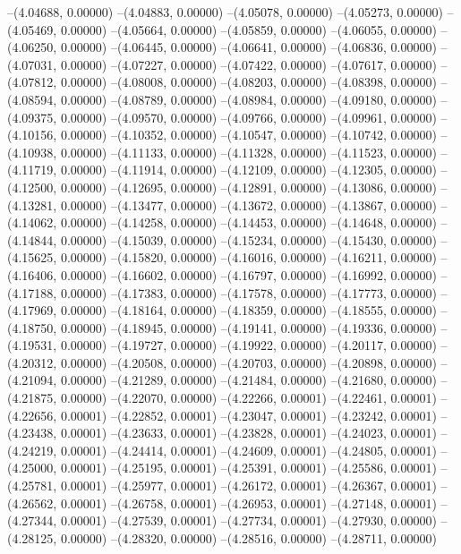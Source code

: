 --(4.04688, 0.00000)
--(4.04883, 0.00000)
--(4.05078, 0.00000)
--(4.05273, 0.00000)
--(4.05469, 0.00000)
--(4.05664, 0.00000)
--(4.05859, 0.00000)
--(4.06055, 0.00000)
--(4.06250, 0.00000)
--(4.06445, 0.00000)
--(4.06641, 0.00000)
--(4.06836, 0.00000)
--(4.07031, 0.00000)
--(4.07227, 0.00000)
--(4.07422, 0.00000)
--(4.07617, 0.00000)
--(4.07812, 0.00000)
--(4.08008, 0.00000)
--(4.08203, 0.00000)
--(4.08398, 0.00000)
--(4.08594, 0.00000)
--(4.08789, 0.00000)
--(4.08984, 0.00000)
--(4.09180, 0.00000)
--(4.09375, 0.00000)
--(4.09570, 0.00000)
--(4.09766, 0.00000)
--(4.09961, 0.00000)
--(4.10156, 0.00000)
--(4.10352, 0.00000)
--(4.10547, 0.00000)
--(4.10742, 0.00000)
--(4.10938, 0.00000)
--(4.11133, 0.00000)
--(4.11328, 0.00000)
--(4.11523, 0.00000)
--(4.11719, 0.00000)
--(4.11914, 0.00000)
--(4.12109, 0.00000)
--(4.12305, 0.00000)
--(4.12500, 0.00000)
--(4.12695, 0.00000)
--(4.12891, 0.00000)
--(4.13086, 0.00000)
--(4.13281, 0.00000)
--(4.13477, 0.00000)
--(4.13672, 0.00000)
--(4.13867, 0.00000)
--(4.14062, 0.00000)
--(4.14258, 0.00000)
--(4.14453, 0.00000)
--(4.14648, 0.00000)
--(4.14844, 0.00000)
--(4.15039, 0.00000)
--(4.15234, 0.00000)
--(4.15430, 0.00000)
--(4.15625, 0.00000)
--(4.15820, 0.00000)
--(4.16016, 0.00000)
--(4.16211, 0.00000)
--(4.16406, 0.00000)
--(4.16602, 0.00000)
--(4.16797, 0.00000)
--(4.16992, 0.00000)
--(4.17188, 0.00000)
--(4.17383, 0.00000)
--(4.17578, 0.00000)
--(4.17773, 0.00000)
--(4.17969, 0.00000)
--(4.18164, 0.00000)
--(4.18359, 0.00000)
--(4.18555, 0.00000)
--(4.18750, 0.00000)
--(4.18945, 0.00000)
--(4.19141, 0.00000)
--(4.19336, 0.00000)
--(4.19531, 0.00000)
--(4.19727, 0.00000)
--(4.19922, 0.00000)
--(4.20117, 0.00000)
--(4.20312, 0.00000)
--(4.20508, 0.00000)
--(4.20703, 0.00000)
--(4.20898, 0.00000)
--(4.21094, 0.00000)
--(4.21289, 0.00000)
--(4.21484, 0.00000)
--(4.21680, 0.00000)
--(4.21875, 0.00000)
--(4.22070, 0.00000)
--(4.22266, 0.00001)
--(4.22461, 0.00001)
--(4.22656, 0.00001)
--(4.22852, 0.00001)
--(4.23047, 0.00001)
--(4.23242, 0.00001)
--(4.23438, 0.00001)
--(4.23633, 0.00001)
--(4.23828, 0.00001)
--(4.24023, 0.00001)
--(4.24219, 0.00001)
--(4.24414, 0.00001)
--(4.24609, 0.00001)
--(4.24805, 0.00001)
--(4.25000, 0.00001)
--(4.25195, 0.00001)
--(4.25391, 0.00001)
--(4.25586, 0.00001)
--(4.25781, 0.00001)
--(4.25977, 0.00001)
--(4.26172, 0.00001)
--(4.26367, 0.00001)
--(4.26562, 0.00001)
--(4.26758, 0.00001)
--(4.26953, 0.00001)
--(4.27148, 0.00001)
--(4.27344, 0.00001)
--(4.27539, 0.00001)
--(4.27734, 0.00001)
--(4.27930, 0.00000)
--(4.28125, 0.00000)
--(4.28320, 0.00000)
--(4.28516, 0.00000)
--(4.28711, 0.00000)
